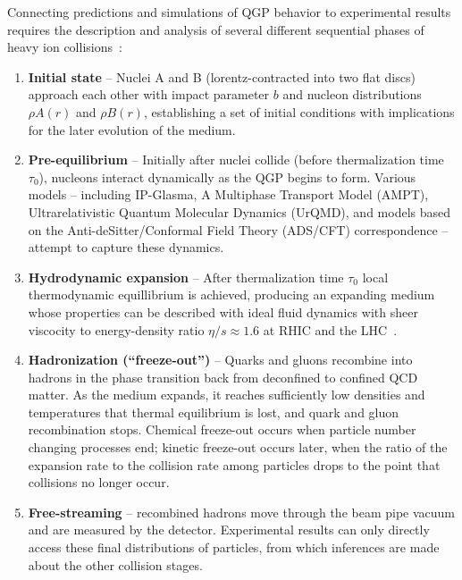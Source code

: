 Connecting predictions and simulations of QGP behavior to experimental results requires the description and analysis of several different sequential phases of heavy ion collisions~\cite{Sarkar:2010zza,Jaiswal:2016hex}:  
\begin{enumerate}
\item \textbf{Initial state} -- Nuclei A and B (lorentz-contracted into two flat discs) approach each other with impact parameter $b$ and nucleon distributions $\rho{A}(r)$ and $\rho{B}(r)$, establishing a set of initial conditions with implications for the later evolution of the medium. 

\item \textbf{Pre-equilibrium} -- Initially after nuclei collide (before thermalization time $\tau_{0}$), nucleons interact dynamically as the QGP begins to form.  Various models -- including IP-Glasma, A Multiphase Transport Model (AMPT), Ultrarelativistic Quantum Molecular Dynamics (UrQMD), and models based on the Anti-deSitter/Conformal Field Theory (ADS/CFT) correspondence -- attempt to capture these dynamics.  

\item \textbf{Hydrodynamic expansion} -- After thermalization time $\tau_{0}$ local thermodynamic equillibrium is achieved, producing an expanding medium whose properties can be described with ideal fluid dynamics with sheer viscocity to energy-density ratio $\eta / s \approx 1.6$ at RHIC and the LHC~\cite{Heinz:2011kt}. 

\item \textbf{Hadronization (``freeze-out'')} -- Quarks and gluons recombine into hadrons in the phase transition back from deconfined to confined QCD matter.  As the medium expands, it reaches sufficiently low densities and temperatures that thermal equilibrium is lost, and quark and gluon recombination stops.  Chemical freeze-out occurs when particle number changing processes end; kinetic freeze-out occurs later, when the ratio of the expansion rate to the collision rate among particles drops to the point that collisions no longer occur.

\item \textbf{Free-streaming} -- recombined hadrons move through the beam pipe vacuum and are measured by the detector.  Experimental results can only directly access these final distributions of particles, from which inferences are made about the other collision stages.  

\end{enumerate}

